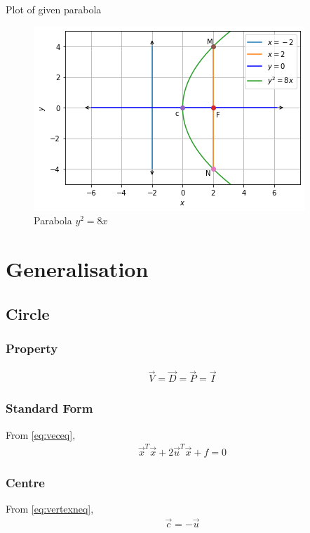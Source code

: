 \documentclass[journal,12pt,twocolumn]{IEEEtran}
\begin{document}
Plot of given parabola

\begin{figure}[!ht]
\centering
\includegraphics[width=\columnwidth]{Figure6}
\caption{Parabola $y^2=8x$ }
\label{fig:parabola}	
\end{figure}

\clearpage
\section{Generalisation}
\subsection{Circle}
\subsubsection{Property}
\begin{align}
    \vec{V}=\vec{D}=\vec{P}=\vec{I}
\end{align}
\subsubsection{Standard Form}
From \eqref{eq:veceq},
\begin{align}
    \vec{x}^T\vec{x}+2\vec{u}^T\vec{x} + f =0
\end{align}
\subsubsection{Centre}
From \eqref{eq:vertexneq},
\begin{align}
    \vec{c} = -\vec{u}
\end{align}
\end{document}
